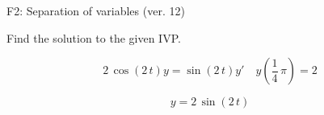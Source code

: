 \begin{exercise}
  \begin{exerciseTitle}F2: Separation of variables (ver. 12)\end{exerciseTitle}
  \begin{exerciseStatement}
    
Find the solution to the given IVP.

    
\[2 \, \cos\left(2 \, t\right) y= \sin\left(2 \, t\right) y'\hspace{1em} y\left( \frac{1}{4} \, \pi \right)= 2\]

  \end{exerciseStatement}
  \begin{exerciseAnswer}
    
\[y= 2 \, \sin\left(2 \, t\right)\]

  \end{exerciseAnswer}
\end{exercise}
